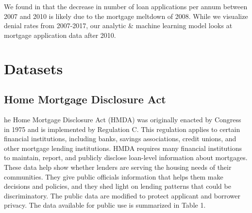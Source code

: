 \documentclass[conference,compsoc]{IEEEtran}
\begin{document}
We found in \cite{CRA} that the decrease in number of loan applications per annum between 2007 and 2010 is likely due to the mortgage meltdown of 2008.  While we visualize denial rates from 2007-2017, our analytic \& machine learning model looks at mortgage application data after 2010.  

\section{Datasets}


\subsection{Home Mortgage Disclosure Act}
he Home Mortgage Disclosure Act (HMDA) was originally enacted by Congress in 1975 and is implemented by Regulation C. This regulation applies to certain financial institutions, including banks, savings associations, credit unions, and other mortgage lending institutions.  HMDA requires many financial institutions to maintain, report, and publicly disclose loan-level information about mortgages. These data help show whether lenders are serving the housing needs of their communities. They give public officials information that helps them make decisions and policies, and they shed light on lending patterns that could be discriminatory. The public data are modified to protect applicant and borrower privacy. The data available for public use is summarized in Table 1.
\end{document}

